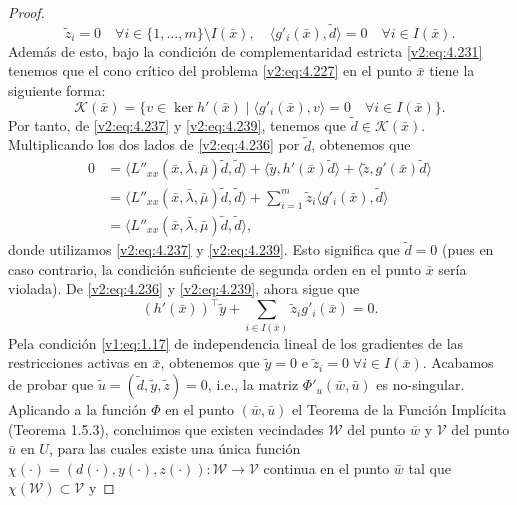 \begin{proof}
\begin{equation}
        \tilde{z}_i = 0 \quad \forall i \in \{1, \dots, m\} \setminus I(\bar{x}), \quad \langle g'_i(\bar{x}), \tilde{d} \rangle = 0 \quad \forall i \in I(\bar{x}).
        \label{v2:eq:4.239}
    \end{equation}
    Además de esto, bajo la condición de complementaridad estricta \eqref{v2:eq:4.231} tenemos que el cono crítico del problema \eqref{v2:eq:4.227} en el punto $\bar{x}$ tiene la siguiente forma:
    \begin{equation}
        \mathcal{K}(\bar{x}) = \{v \in \ker h'(\bar{x}) \mid \langle g'_i(\bar{x}), v \rangle = 0 \quad \forall i \in I(\bar{x})\}.
        \label{v2:eq:4.240}
    \end{equation}
    Por tanto, de \eqref{v2:eq:4.237} y \eqref{v2:eq:4.239}, tenemos que $\tilde{d} \in \mathcal{K}(\bar{x})$. Multiplicando los dos lados de \eqref{v2:eq:4.236} por $\tilde{d}$, obtenemos que
    \begin{align*}
        0 &= \langle L''_{xx}(\bar{x}, \bar{\lambda}, \bar{\mu})\tilde{d}, \tilde{d} \rangle + \langle \tilde{y}, h'(\bar{x})\tilde{d} \rangle + \langle \tilde{z}, g'(\bar{x})\tilde{d} \rangle \\
        &= \langle L''_{xx}(\bar{x}, \bar{\lambda}, \bar{\mu})\tilde{d}, \tilde{d} \rangle + \sum_{i=1}^m \tilde{z}_i \langle g'_i(\bar{x}), \tilde{d} \rangle \\
        &= \langle L''_{xx}(\bar{x}, \bar{\lambda}, \bar{\mu})\tilde{d}, \tilde{d} \rangle,
    \end{align*}
    donde utilizamos \eqref{v2:eq:4.237} y \eqref{v2:eq:4.239}.
    Esto significa que $\tilde{d} = 0$ (pues en caso contrario, la condición suficiente de segunda orden en el punto $\bar{x}$ sería violada). De \eqref{v2:eq:4.236} y \eqref{v2:eq:4.239}, ahora sigue que
    \[
        (h'(\bar{x}))^\top \tilde{y} + \sum_{i \in I(\bar{x})} \tilde{z}_i g'_i(\bar{x}) = 0.
    \]
    Pela condición \eqref{v1:eq:1.17} de independencia lineal de los gradientes de las restricciones activas en $\bar{x}$, obtenemos que $\tilde{y} = 0$ e $\tilde{z}_i = 0 \; \forall i \in I(\bar{x})$. Acabamos de probar que $\tilde{u} = (\tilde{d}, \tilde{y}, \tilde{z}) = 0$, i.e., la matriz $\Phi'_u(\bar{w}, \bar{u})$ es no-singular.
    Aplicando a la función $\Phi$ en el punto $(\bar{w}, \bar{u})$ el Teorema de la Función Implícita (Teorema 1.5.3), concluimos que existen vecindades $\mathcal{W}$ del punto $\bar{w}$ y $\mathcal{V}$ del punto $\bar{u}$ en $U$, para las cuales existe una única función $\chi(\cdot) = (d(\cdot), y(\cdot), z(\cdot)) \colon \mathcal{W} \to \mathcal{V}$ continua en el punto $\bar{w}$ tal que $\chi(\mathcal{W}) \subset \mathcal{V}$ y

\end{proof}
